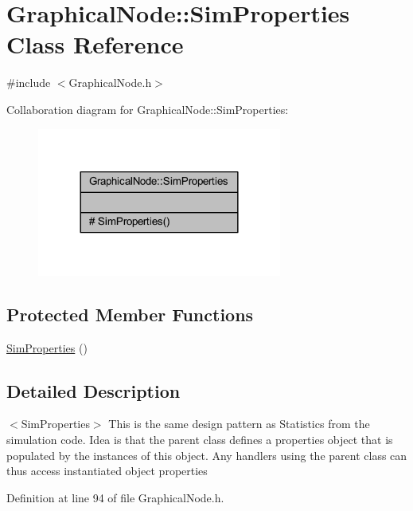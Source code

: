 \hypertarget{class_graphical_node_1_1_sim_properties}{}\section{Graphical\+Node\+:\+:Sim\+Properties Class Reference}
\label{class_graphical_node_1_1_sim_properties}


{\ttfamily \#include $<$Graphical\+Node.\+h$>$}



Collaboration diagram for Graphical\+Node\+:\+:Sim\+Properties\+:
\nopagebreak
\begin{figure}[H]
\begin{center}
\leavevmode
\includegraphics[width=228pt]{class_graphical_node_1_1_sim_properties__coll__graph}
\end{center}
\end{figure}
\subsection*{Protected Member Functions}
\begin{DoxyCompactItemize}
\item 
\hyperlink{class_graphical_node_1_1_sim_properties_a86292c6d408d98917272ddcd47264eaa}{Sim\+Properties} ()
\end{DoxyCompactItemize}


\subsection{Detailed Description}
$<$\+Sim\+Properties$>$ This is the same design pattern as Statistics from the simulation code. Idea is that the parent class defines a properties object that is populated by the instances of this object. Any handlers using the parent class can thus access instantiated object properties 

Definition at line 94 of file Graphical\+Node.\+h.



